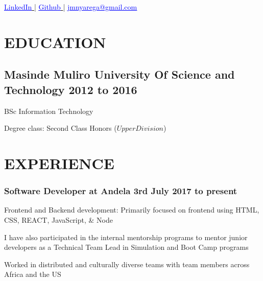 \documentclass{article}
\author{Josiah Mokobo Nyarega}
\begin{document}
\renewcommand{\maketitle}{
  \begin{center}
    {
      \huge\bfseries
      \theauthor
    }

    \href{https://www.linkedin.com/in/josiah-nyarega-84820a103}{
      \textcolor{blue}{
        \underline{LinkedIn}
      }
    } |
    \href{https://www.github.com/jmnyarega}{
      \textcolor{blue}{
      \underline{Github}
      }
    } |
    \href{jmnyarega@gmail.com}{
      \textcolor{blue}{
        \underline{jmnyarega@gmail.com}
      }
    }
\end{center}
}
\maketitle

\section{EDUCATION}
\subsection{Masinde Muliro University Of Science and Technology\hspace{130pt} \textbf{2012 to 2016}}
\begin{description}[font=$\bullet$~\normalfont\scshape\color{red!50!black}]
  \item{BSc Information Technology}
  \item{Degree class: Second Class Honors (\(Upper Division\))}
\end{description}
\section{EXPERIENCE}
\subsubsection{Software Developer at Andela\hspace{190pt} \textbf{3rd July 2017 to present}}
\begin{description}[font=$\bullet$~\normalfont\scshape\color{red!50!black}]
  \item{Frontend and Backend development: Primarily focused on frontend using HTML, CSS, REACT, JavaScript, \& Node}
  \item{I have also participated in the internal mentorship programs to mentor junior developers as a Technical Team Lead in Simulation and Boot Camp programs}
  \item{Worked in distributed and culturally diverse teams with team members across Africa and the US}
\end{description}
\end{document}
